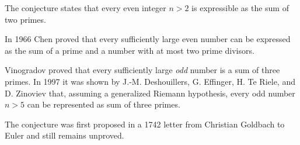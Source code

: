 \documentclass{article}
\begin{document}
The conjecture states that every even integer $n>2$ is expressible as the sum of two primes.

In 1966 Chen proved that every sufficiently large even number can be expressed as the sum of a prime and a number with at most two prime divisors.

Vinogradov proved that every sufficiently large \emph{odd} number is a sum of three primes. In 1997 it was shown by J.-M. Deshouillers, G. Effinger, H. Te Riele, and D. Zinoviev that, assuming a generalized Riemann hypothesis, every odd number $n>5$ can be represented as sum of three primes.

The conjecture was first proposed in a 1742 letter from Christian Goldbach to Euler and still remains unproved.
\end{document}
